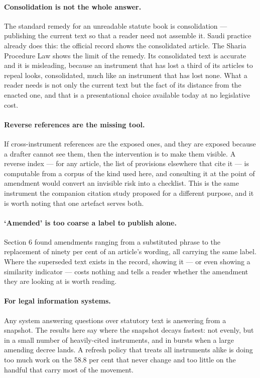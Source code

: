 \documentclass[11pt]{article}
\begin{document}
\paragraph{Consolidation is not the whole answer.} The standard remedy for an
unreadable statute book is consolidation --- publishing the current text so
that a reader need not assemble it. Saudi practice already does this: the
official record shows the consolidated article. The Sharia Procedure Law shows
the limit of the remedy. Its consolidated text is accurate and it is
misleading, because an instrument that has lost a third of its articles to
repeal looks, consolidated, much like an instrument that has lost none. What a
reader needs is not only the current text but the fact of its distance from
the enacted one, and that is a presentational choice available today at no
legislative cost.

\paragraph{Reverse references are the missing tool.} If cross-instrument
references are the exposed ones, and they are exposed because a drafter cannot
see them, then the intervention is to make them visible. A reverse index ---
for any article, the list of provisions elsewhere that cite it --- is
computable from a corpus of the kind used here, and consulting it at the point
of amendment would convert an invisible risk into a checklist. This is the
same instrument the companion citation study proposed for a different purpose,
and it is worth noting that one artefact serves both.

\paragraph{`Amended' is too coarse a label to publish alone.} Section
6 found amendments ranging from a substituted phrase to the
replacement of ninety per cent of an article's wording, all carrying the same
label. Where the superseded text exists in the record, showing it --- or even
showing a similarity indicator --- costs nothing and tells a reader whether
the amendment they are looking at is worth reading.

\paragraph{For legal information systems.} Any system answering questions over
statutory text is answering from a snapshot. The results here say where the
snapshot decays fastest: not evenly, but in a small number of heavily-cited
instruments, and in bursts when a large amending decree lands. A refresh policy
that treats all instruments alike is doing too much work on the 58.8 per cent
that never change and too little on the handful that carry most of the
movement.
\end{document}

